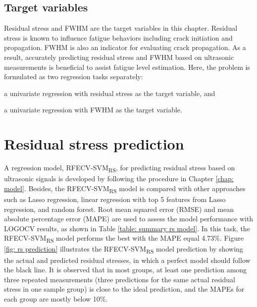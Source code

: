 \subsection{Target variables}
Residual stress and FWHM are the target variables in this chapter. Residual stress is known to influence fatigue behaviors including crack initiation and propagation. FWHM is also an indicator for evaluating crack propagation. As a result, accurately predicting residual stress and FWHM based on ultrasonic measurements is beneficial to assist fatigue level estimation. Here, the problem is formulated as two regression tasks separately:
\begin{enumerate*}[label=(\alph*)]
    \item a univariate regression with residual stress as the target variable, and
    \item a univariate regression with FWHM as the target variable.
\end{enumerate*}


\section{Residual stress prediction}
\label{sec: rs prediction}
A regression model, RFECV-SVM\textsubscript{RS}, for predicting residual stress based on ultrasonic signals is developed by following the procedure in Chapter \ref{chap: model}. Besides, the RFECV-SVM\textsubscript{RS} model is compared with other approaches such as Lasso regression, linear regression with top 5 features from Lasso regression, and random forest. Root mean squared error (RMSE) and mean absolute percentage error (MAPE) are used to assess the model performance with LOGOCV results, as shown in Table \ref{table: summary rs model}. In this task, the RFECV-SVM\textsubscript{RS} model performs the best with the MAPE equal 4.73\%. Figure \ref{fig: rs prediction} illustrates the RFECV-SVM\textsubscript{RS} model prediction by showing the actual and predicted residual stresses, in which a perfect model should follow the black line. It is observed that in most groups, at least one prediction among three repeated measurements (three predictions for the same actual residual stress in one sample group) is close to the ideal prediction, and the MAPEs for each group are mostly below 10\%.

